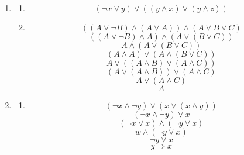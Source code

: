 \documentclass[a4paper]{article}
\begin{document}
	\begin{enumerate}
		\item
		\begin{enumerate}
			\item
			\begin{equation*}
				(\lnot x \lor y) \lor ((y \land x) \lor (y \land z))				
			\end{equation*}
			
			\item
			\begin{equation*}
				((A \lor \lnot B) \land (A \lor A)) \land (A \lor B \lor C)
			\end{equation*}
			\begin{equation*}
				((A \lor \lnot B) \land A) \land (A \lor (B \lor C))
			\end{equation*}
			\begin{equation*}
				A \land (A \lor (B \lor C))
			\end{equation*}
			\begin{equation*}
				(A \land A) \lor (A \land (B \lor C))
			\end{equation*}
			\begin{equation*}
				A \lor ((A \land B) \lor (A \land C))
			\end{equation*}
			\begin{equation*}
				(A \lor (A \land B)) \lor (A \land C)
			\end{equation*}
			\begin{equation*}
				A \lor (A \land C)
			\end{equation*}
			\begin{equation*}
				A
			\end{equation*}
		\end{enumerate}
		
		\item
		\begin{enumerate}
			\item
			\begin{equation*}
				(\lnot x \land \lnot y) \lor (x \lor (x \land y))
			\end{equation*}
			\begin{equation*}
				(\lnot x \land \lnot y) \lor x
			\end{equation*}
			\begin{equation*}
				(\lnot x \lor x) \land (\lnot y \lor x)
			\end{equation*}
			\begin{equation*}
				w \land (\lnot y \lor x)
			\end{equation*}
			\begin{equation*}
				\lnot y \lor x
			\end{equation*}
			\begin{equation*}
				y \Rightarrow x
			\end{equation*}
			

\end{enumerate}
\end{enumerate}
\end{document}
